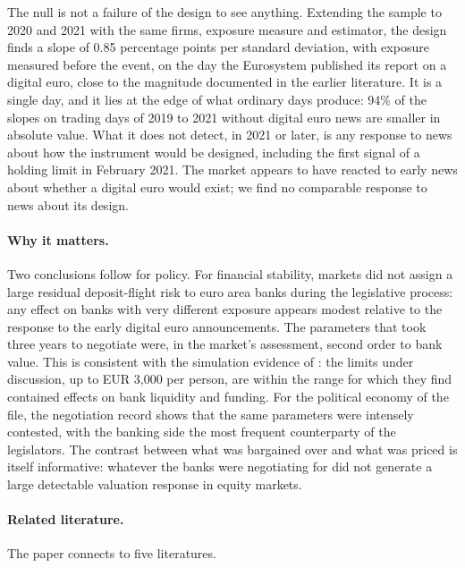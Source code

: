 \documentclass[11pt]{article}
\theoremstyle{plain}\newtheorem{proposition}{Proposition}
\begin{document}
The null is not a failure of the design to see anything. Extending the sample to 2020 and 2021 with the same firms, exposure measure and estimator, the design finds a slope of 0.85 percentage points per standard deviation, with exposure measured before the event, on the day the Eurosystem published its report on a digital euro, close to the magnitude documented in the earlier literature. It is a single day, and it lies at the edge of what ordinary days produce: 94\% of the slopes on trading days of 2019 to 2021 without digital euro news are smaller in absolute value. What it does not detect, in 2021 or later, is any response to news about how the instrument would be designed, including the first signal of a holding limit in February 2021. The market appears to have reacted to early news about whether a digital euro would exist; we find no comparable response to news about its design.

\paragraph{Why it matters.} Two conclusions follow for policy. For financial stability, markets did not assign a large residual deposit-flight risk to euro area banks during the legislative process: any effect on banks with very different exposure appears modest relative to the response to the early digital euro announcements. The parameters that took three years to negotiate were, in the market's assessment, second order to bank value. This is consistent with the simulation evidence of \citet{meller2023}: the limits under discussion, up to EUR 3,000 per person, are within the range for which they find contained effects on bank liquidity and funding. For the political economy of the file, the negotiation record shows that the same parameters were intensely contested, with the banking side the most frequent counterparty of the legislators. The contrast between what was bargained over and what was priced is itself informative: whatever the banks were negotiating for did not generate a large detectable valuation response in equity markets.

\paragraph{Related literature.} The paper connects to five literatures.
\end{document}
